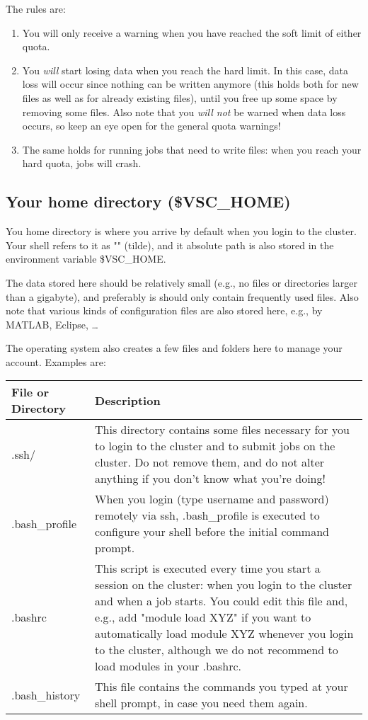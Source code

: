 The rules are:
\begin{enumerate}
\item  You will only receive a warning when you have reached the soft limit of either quota.
\item  You \emph{will} start losing data when you reach the hard limit. In this
  case, data loss will occur  since nothing can be written anymore (this holds
  both for new files as well as for already existing files), until you free up
  some space by removing some files. Also note that you \emph{will not} be
  warned when data loss occurs, so keep an eye open for the general quota
  warnings!
\item  The same holds for running jobs that need to write files: when you reach
  your hard quota, jobs will crash.
\end{enumerate}

\subsection{Your home directory (\$VSC\_HOME)}

You home directory is where you arrive by default when you login to the
cluster. Your shell refers to it as "\tilde" (tilde), and it absolute path is also
stored in the environment variable \$VSC\_HOME.

The data stored here should be relatively small (e.g., no files or directories
larger than a gigabyte), and preferably is should only contain frequently used
files. Also note that various kinds of configuration files are also stored
here, e.g., by MATLAB, Eclipse, \ldots

The operating system also creates a few files and folders here to manage your
account. Examples are:

\begin{tabular}{|p{}|p{}|} \hline
\textbf{File or Directory} & \textbf{Description} \\ \hline
.ssh/                      & This directory contains some files necessary for you to login to the cluster and to submit jobs on the cluster. Do not remove them, and do not alter anything if you don't know what you're doing! \\ \hline
.bash\_profile             & When you login (type username and password) remotely via ssh, .bash\_profile is executed to configure your shell before the initial command prompt. \\ \hline
.bashrc                    & This script is executed every time you start a session on the cluster: when you login to the cluster and when a job starts. You could edit this file and, e.g., add "module load XYZ" if you want to automatically load module XYZ whenever you login to the cluster, although we do not recommend to load modules in your .bashrc. \\ \hline
.bash\_history             & This file contains the commands you typed at your shell prompt, in case you need them again. \\ \hline
\end{tabular}

